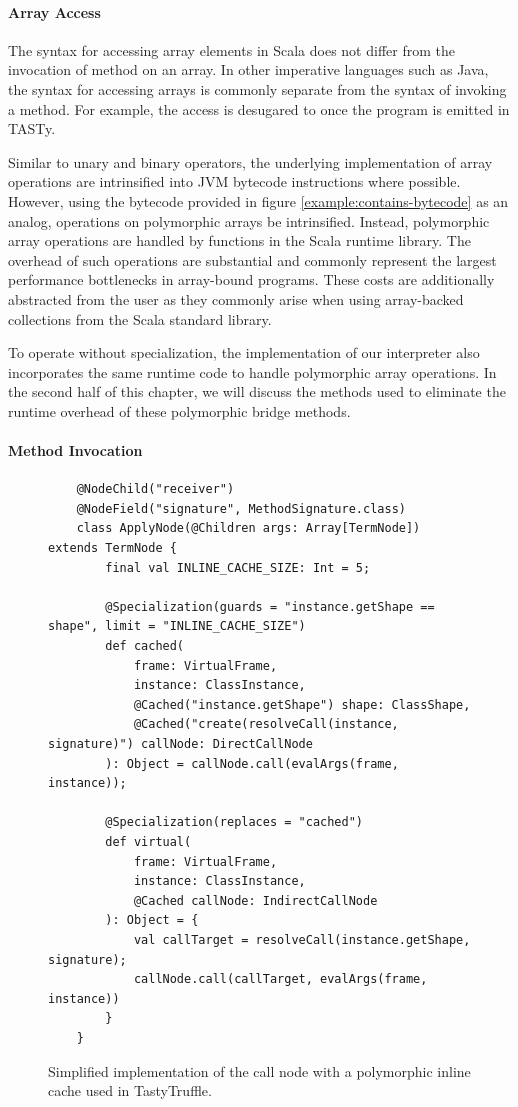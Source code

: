 \paragraph{Array Access}

The syntax for accessing array elements in Scala does not differ from the invocation of method on an array.
In other imperative languages such as Java, the syntax for accessing arrays is commonly separate from the syntax of invoking a method.
For example, the access  is desugared to  once the program is emitted in TASTy.

Similar to unary and binary operators, the underlying implementation of array operations are intrinsified into JVM bytecode instructions where possible.
However, using the bytecode provided in figure \ref{example:contains-bytecode} as an analog, operations on polymorphic arrays  be intrinsified.
Instead, polymorphic array operations are handled by functions in the Scala runtime library.
The overhead of such operations are substantial and commonly represent the largest performance bottlenecks in array-bound programs.
These costs are additionally abstracted from the user as they commonly arise when using array-backed collections from the Scala standard library.

To operate without specialization, the implementation of our interpreter also incorporates the same runtime code to handle polymorphic array operations.
In the second half of this chapter, we will discuss the methods used to eliminate the runtime overhead of these polymorphic bridge methods.

\paragraph{Method Invocation}

\begin{figure}[!htb]
	\begin{verbatim}
	@NodeChild("receiver")
	@NodeField("signature", MethodSignature.class)
	class ApplyNode(@Children args: Array[TermNode]) extends TermNode {
		final val INLINE_CACHE_SIZE: Int = 5;
		
		@Specialization(guards = "instance.getShape == shape", limit = "INLINE_CACHE_SIZE")
		def cached(
			frame: VirtualFrame,
			instance: ClassInstance,
			@Cached("instance.getShape") shape: ClassShape,
			@Cached("create(resolveCall(instance, signature)") callNode: DirectCallNode
		): Object = callNode.call(evalArgs(frame, instance));
		
		@Specialization(replaces = "cached")
		def virtual(
			frame: VirtualFrame,
			instance: ClassInstance,
			@Cached callNode: IndirectCallNode
		): Object = {
			val callTarget = resolveCall(instance.getShape, signature);
			callNode.call(callTarget, evalArgs(frame, instance))
		}
	}
	\end{verbatim}
	\caption{Simplified implementation of the call node with a polymorphic inline cache used in TastyTruffle.}
	\label{implementation:poly-cache-call-node}
\end{figure}

